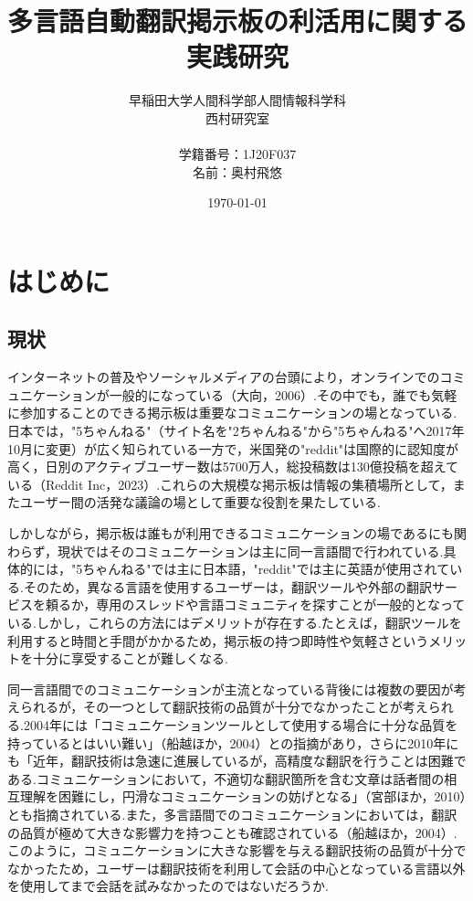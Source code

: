 \documentclass[b5paper,12pt,dvipdfmx]{jsreport}
\title{多言語自動翻訳掲示板の利活用に関する実践研究}
\author{早稲田大学人間科学部人間情報科学科\\西村研究室\\ \\学籍番号：1J20F037\\名前：奥村飛悠}
\date{\today}
\begin{document}
\maketitle

\tableofcontents

\clearpage %
\chapter{はじめに}
 
\section{現状}

インターネットの普及やソーシャルメディアの台頭により，オンラインでのコミュニケーションが一般的になっている（大向，2006）.その中でも，誰でも気軽に参加することのできる掲示板は重要なコミュニケーションの場となっている.日本では，"5ちゃんねる"（サイト名を"2ちゃんねる"から"5ちゃんねる"へ2017年10月に変更）が広く知られている一方で，米国発の"reddit"は国際的に認知度が高く，日別のアクティブユーザー数は5700万人，総投稿数は130億投稿を超えている（Reddit Inc，2023）.これらの大規模な掲示板は情報の集積場所として，またユーザー間の活発な議論の場として重要な役割を果たしている.

しかしながら，掲示板は誰もが利用できるコミュニケーションの場であるにも関わらず，現状ではそのコミュニケーションは主に同一言語間で行われている.具体的には，"5ちゃんねる"では主に日本語，"reddit"では主に英語が使用されている.そのため，異なる言語を使用するユーザーは，翻訳ツールや外部の翻訳サービスを頼るか，専用のスレッドや言語コミュニティを探すことが一般的となっている.しかし，これらの方法にはデメリットが存在する.たとえば，翻訳ツールを利用すると時間と手間がかかるため，掲示板の持つ即時性や気軽さというメリットを十分に享受することが難しくなる.

同一言語間でのコミュニケーションが主流となっている背後には複数の要因が考えられるが，その一つとして翻訳技術の品質が十分でなかったことが考えられる.2004年には「コミュニケーションツールとして使用する場合に十分な品質を持っているとはいい難い」（船越ほか，2004）との指摘があり，さらに2010年にも「近年，翻訳技術は急速に進展しているが，高精度な翻訳を行うことは困難である.コミュニケーションにおいて，不適切な翻訳箇所を含む文章は話者間の相互理解を困難にし，円滑なコミュニケーションの妨げとなる」（宮部ほか，2010）とも指摘されている.また，多言語間でのコミュニケーションにおいては，翻訳の品質が極めて大きな影響力を持つことも確認されている（船越ほか，2004）.このように，コミュニケーションに大きな影響を与える翻訳技術の品質が十分でなかったため，ユーザーは翻訳技術を利用して会話の中心となっている言語以外を使用してまで会話を試みなかったのではないだろうか.
\end{document}
